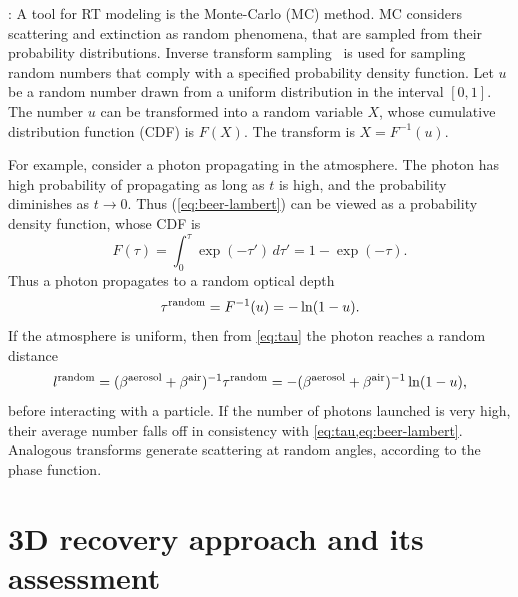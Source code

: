 \documentclass[10pt,letterpaper]{article}
\newcommand{\derivsym}[1]{\,d{#1}}
\begin{document}
: A tool for RT modeling is
the Monte-Carlo (MC) method. MC considers scattering and extinction as
random phenomena, that are sampled from their probability
distributions. 
Inverse transform sampling~\cite{devroye1986sample} is used for 
sampling random numbers that comply with a specified
probability density function. Let $u$ be a random number drawn
from a uniform distribution in the interval $[0,1]$. The number $u$
can be transformed into a random variable $X$, whose cumulative
distribution function (CDF) is $F(X)$. The transform is $X =
F^{-1}(u)$.

For example, consider a photon propagating in the atmosphere.  The
photon has high probability of propagating as long as $t$ is high, and
the probability diminishes as $t\rightarrow 0$. Thus
(\cref{eq:beer-lambert}) can be viewed as a probability density
function, whose CDF is
\begin{equation}
  \label{eq:Ftau}
  F(\tau)=\int_{0}^{\tau}\exp(-\tau')\derivsym{\tau'}=1-\exp(-\tau).
\end{equation}
Thus a photon propagates to a random optical depth
\begin{equation}
  \label{eq:taurand}
  \tau^{\rm random}=F^{-1}(u)=-\ln(1-u).
\end{equation}
If the atmosphere is uniform, then from \cref{eq:tau} the photon
reaches a random distance
\begin{equation}
  \label{eq:lrand}
  l^{\rm random}= (\beta^{\rm aerosol}+\beta^{\rm air})^{-1} \tau^{\rm random}
  = -(\beta^{\rm aerosol}+\beta^{\rm air})^{-1}\ln(1-u),
\end{equation}
before interacting with a particle. If the number of photons launched
is very high, their average number falls off in consistency with
\cref{eq:tau,eq:beer-lambert}.  Analogous transforms
generate scattering at random angles, according to the phase function.


\section{3D recovery approach and its assessment}
\label{sec:methodology}
\end{document}
